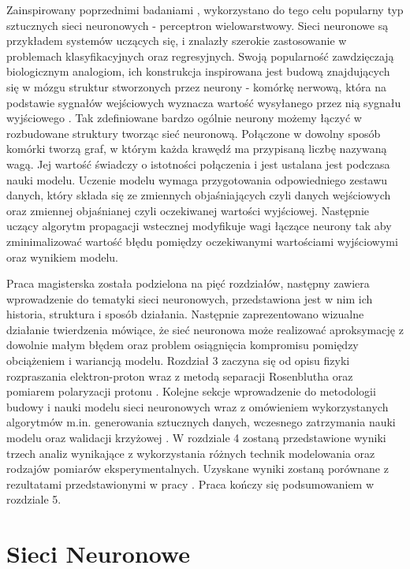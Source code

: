 \documentclass[11pt]{book}
\theoremstyle{definition}
\begin{document}
Zainspirowany poprzednimi badaniami \cite{2009PhRvC..79f5204A}, \cite{PhysRevC.84.034314} wykorzystano do tego celu popularny typ sztucznych sieci neuronowych - perceptron wielowarstwowy. Sieci neuronowe są przykładem systemów uczących się, i znalazły szerokie zastosowanie w problemach klasyfikacyjnych oraz regresyjnych. Swoją popularność zawdzięczają biologicznym analogiom, ich konstrukcja inspirowana jest budową znajdujących się w mózgu struktur stworzonych przez neurony - komórkę nerwową, która na podstawie sygnałów wejściowych wyznacza wartość wysyłanego przez nią sygnału wyjściowego \cite{1957Rosenblatt}. Tak zdefiniowane bardzo ogólnie neurony możemy łączyć w rozbudowane struktury tworząc sieć neuronową. Połączone w dowolny sposób komórki tworzą graf, w którym każda krawędź ma przypisaną liczbę nazywaną wagą. Jej wartość świadczy o istotności połączenia i jest ustalana jest podczasa nauki modelu. Uczenie modelu wymaga przygotowania odpowiedniego zestawu danych, który składa się ze zmiennych objaśniających czyli danych wejściowych oraz zmiennej objaśnianej czyli oczekiwanej wartości wyjściowej. Następnie uczący algorytm propagacji wstecznej modyfikuje wagi łączące neurony tak aby zminimalizować wartość błędu pomiędzy oczekiwanymi wartościami wyjściowymi oraz wynikiem modelu. 

Praca magisterska została podzielona na pięć rozdziałów, następny zawiera wprowadzenie do tematyki sieci neuronowych, przedstawiona jest w nim ich historia, struktura i sposób działania. Następnie zaprezentowano wizualne działanie twierdzenia mówiące, że sieć neuronowa może realizować aproksymację z dowolnie małym błędem oraz problem osiągnięcia kompromisu pomiędzy obciążeniem i wariancją modelu. Rozdział 3 zaczyna się od opisu fizyki rozpraszania elektron-proton wraz z metodą separacji Rosenblutha \cite{PhysRev.79.615} oraz pomiarem polaryzacji protonu \cite{Akhiezer:1974em}. Kolejne sekcje wprowadzenie do metodologii budowy i nauki modelu sieci neuronowych wraz z omówieniem wykorzystanych algorytmów m.in. generowania sztucznych danych, wczesnego zatrzymania nauki modelu oraz walidacji krzyżowej . W rozdziale 4 zostaną przedstawione wyniki trzech analiz wynikające z wykorzystania różnych technik modelowania oraz rodzajów pomiarów eksperymentalnych. Uzyskane wyniki zostaną porównane z rezultatami przedstawionymi w pracy \cite{PhysRevC.84.034314}. Praca kończy się podsumowaniem w rozdziale 5.



\chapter[\color{red}Sieci Neuronowe]{Sieci Neuronowe}
\label{sieci}
\end{document}
